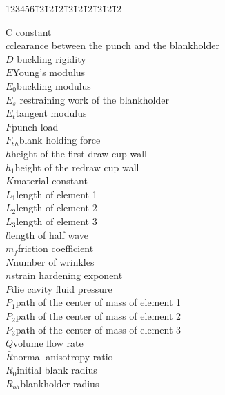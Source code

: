  \begin{tabbing}
 123456\=12\=12\=12\=12\=12\=12\=12\=12\=12 \kill

\>C \>\>\>\>\>constant\\
\>$c$\>\>\>\>\>clearance between the punch and the blankholder\\
\>$D$ \>\>\>\>\>buckling rigidity \\
\>$E$\>\>\>\>\>Young's modulus\\
\>$E_0$\>\>\>\>\>buckling modulus \\
 \>$E_s$ \>\>\>\>\>restraining work of the blankholder\\
     \>$E_t$\>\>\>\>\>tangent modulus \\
           \>$F$\>\>\>\>\>punch load \\
           \>$F_{bh}$\>\>\>\>\>blank holding force \\
           \>$h$\>\>\>\>\>height of the first draw cup wall\\
            \>$h_1$\>\>\>\>\>height of the redraw cup wall \\
            \>$K$\>\>\>\>\>material constant\\
            \>$L_1$\>\>\>\>\>length of element 1\\
             \>$L_2$\>\>\>\>\>length of element 2\\
             \>$L_3$\>\>\>\>\>length of element 3\\
             \>$l$\>\>\>\>\>length of half wave\\
             \>$m_f$\>\>\>\>\>friction coefficient\\
             \>$N$\>\>\>\>\>number of wrinkles\\
             \>$n$\>\>\>\>\>strain hardening exponent \\
             \>$P$\>\>\>\>\>die cavity fluid pressure \\
             \>$P_1$\>\>\>\>\>path of the center of mass of element 1\\
             \>$P_2$\>\>\>\>\>path of the center of mass of element 2\\
             \>$P_3$\>\>\>\>\>path of the center of mass of element 3\\
             \>$Q$\>\>\>\>\>volume flow rate \\
             \>$\bar{R}$\>\>\>\>\>normal anisotropy ratio\\
             \>$R_0$\>\>\>\>\>initial blank radius\\
             \>$R_{bh}$\>\>\>\>\>blankholder radius \\

\end{tabbing}
